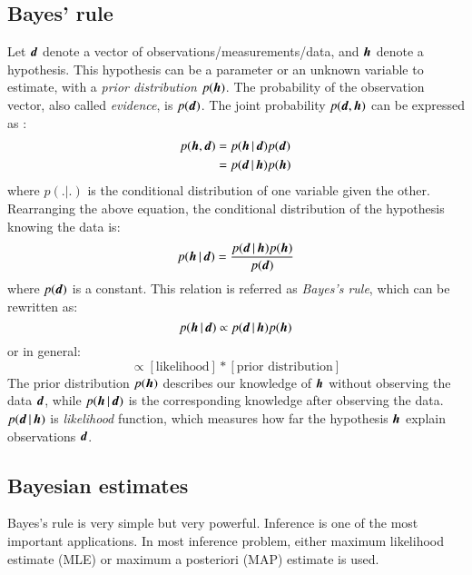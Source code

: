 \subsection{Bayes' rule}
Let $ \operatorname{\boldsymbol{d}} $ denote a vector of observations/measurements/data, and $ \operatorname{\boldsymbol{h}} $ denote a hypothesis. This hypothesis can be a parameter or an unknown variable to estimate, with a \textit{prior distribution} $ p(\operatorname{\boldsymbol{h}}) $. The probability of the observation vector, also called \textit{evidence}, is $ p(\operatorname{\boldsymbol{d}}) $. The joint probability $ p(\operatorname{\boldsymbol{d}},\operatorname{\boldsymbol{h}}) $ can be expressed as \citep{kendall1987kendall}: 
\begin{equation}
\begin{split}
p(\operatorname{\boldsymbol{h}},\operatorname{\boldsymbol{d}}) &= p(\operatorname{\boldsymbol{h}}|\operatorname{\boldsymbol{d}}) p(\operatorname{\boldsymbol{d}}) \\
								 &= p(\operatorname{\boldsymbol{d}}|\operatorname{\boldsymbol{h}}) p(\operatorname{\boldsymbol{h}})
\end{split}
\end{equation}
where $ p(.|.)  $ is the conditional distribution of one variable given the other. Rearranging the above equation, the conditional distribution of the hypothesis knowing the data is:
\begin{equation}
p(\operatorname{\boldsymbol{h}}|\operatorname{\boldsymbol{d}}) =  \frac{p(\operatorname{\boldsymbol{d}}|\operatorname{\boldsymbol{h}}) p(\operatorname{\boldsymbol{h}})}{p(\operatorname{\boldsymbol{d}})}
\end{equation}
where $ p(\operatorname{\boldsymbol{d}}) $ is a constant. This relation is referred as \textit{Bayes's rule}, which can be rewritten as:
\begin{equation}
p(\operatorname{\boldsymbol{h}}|\operatorname{\boldsymbol{d}}) \propto p(\operatorname{\boldsymbol{d}}|\operatorname{\boldsymbol{h}}) p(\operatorname{\boldsymbol{h}})
\end{equation}
or in general:
\begin{equation}
[\text{posterior distribution}] \propto [\text{likelihood}]*[\text{prior distribution}]
\end{equation}
The prior distribution $ p(\operatorname{\boldsymbol{h}}) $ describes our knowledge of $ \operatorname{\boldsymbol{h}} $ without observing the data $ \operatorname{\boldsymbol{d}} $, while $ p(\operatorname{\boldsymbol{h}}|\operatorname{\boldsymbol{d}}) $ is the corresponding knowledge after observing the data. $ p(\operatorname{\boldsymbol{d}}|\operatorname{\boldsymbol{h}}) $ is \textit{likelihood} function, which measures how far the hypothesis $ \operatorname{\boldsymbol{h}} $ explain observations $ \operatorname{\boldsymbol{d}} $.

\subsection{Bayesian estimates}
Bayes's rule is very simple but very powerful. Inference is one of the most important  applications. In most inference problem, either maximum likelihood estimate (MLE) or maximum a posteriori (MAP) estimate is used.

